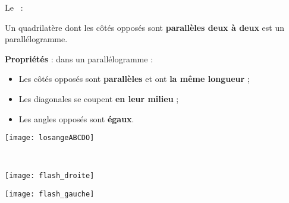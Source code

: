 \begin{definition}
Le  :

Un quadrilatère dont les côtés opposés sont \textcolor{C2}{\textbf{parallèles deux à deux}} est un parallélogramme. \\[-5em]
\begin{minipage}[t]{0.76\linewidth}
\textcolor{H1}{\textbf{Propriétés}} : dans un parallélogramme :
\begin{itemize}
 \item Les côtés opposés sont \textcolor{H1}{\textbf{parallèles}} et ont \textcolor{H1}{\textbf{la même longueur}} ;
 \item Les diagonales se coupent \textcolor{H1}{\textbf{en leur milieu}} ;
 \item Les angles opposés sont \textcolor{H1}{\textbf{égaux}}.
 \end{itemize}
 \end{minipage}
 \begin{minipage}[c]{0.18\linewidth}
 \vspace{1cm}
  \texttt{[image: losangeABCDO]}
  \end{minipage} \\
\end{definition}

\begin{minipage}[t]{0.49\linewidth}
\begin{center} \texttt{[image: flash\_droite]} \end{center}
 \end{minipage}
 \begin{minipage}[t]{0.49\linewidth}
\begin{center} \texttt{[image: flash\_gauche]} \end{center}
 \end{minipage} \\

